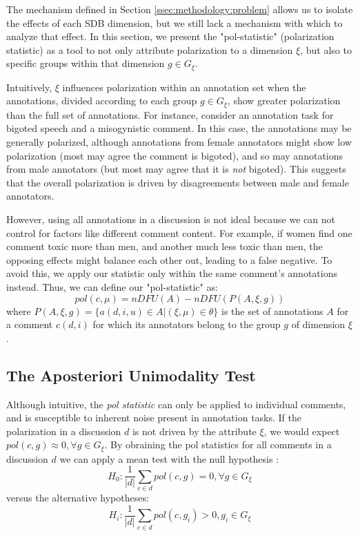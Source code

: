 \documentclass{article}
\begin{document}
The mechanism defined in Section \ref{ssec:methodology:problem} allows us to isolate the effects of each \ac{SDB} dimension, but we still lack a mechanism with which to analyze that effect. In this section, we present the "pol-statistic" (polarization statistic) as a tool to not only attribute polarization to a dimension $\xi$, but also to specific groups within that dimension $g \in G_{\xi}$.

Intuitively, $\xi$ influences polarization within an annotation set when the annotations, divided according to each group $g \in G_{\xi}$, show greater polarization than the full set of annotations. For instance, consider an annotation task for bigoted speech and a misogynistic comment. In this case, the annotations may be generally polarized, although annotations from female annotators might show low polarization (most may agree the comment is bigoted), and so may annotations from male annotators (but most may agree that it is \textit{not} bigoted). This suggests that the overall polarization is driven by disagreements between male and female annotators. %

 However, using all annotations in a discussion is not ideal because we can not control for factors like different comment content. For example, if women find one comment toxic more than men, and another much less toxic than men, the opposing effects might balance each other out, leading to a false negative. To avoid this, we apply our statistic only within the same comment’s annotations instead. Thus, we can define our "pol-statistic" as:%
\begin{equation}
	pol(c, \mu) = nDFU(A) - nDFU(P(A, \xi, g))
\end{equation}
\noindent where $P(A,\xi, g) = \{a(d, i, u) \in A | (\xi, \mu) \in \theta\}$ is the set of annotations $A$ for a comment $c(d, i)$ for which its annotators belong  to the group $g$ of dimension $\xi$.


\subsection{The Aposteriori Unimodality Test}
\label{ssec:methodology:aposteriori}

Although intuitive, the \textit{pol statistic} can only be applied to individual comments, and is susceptible to inherent noise present in annotation tasks. If the polarization in a discussion $d$ is not driven by the attribute $\xi$, we would expect $pol(c, g) \approx 0,  \forall g \in G_{\xi}$. By obraining the pol statistics for all comments in a discussion $d$ we can apply a mean test with the null hypothesis :
\begin{equation}
	H_0: \frac{1}{\lvert d \rvert} \sum\limits_{c \in d} pol(c, g) = 0, \forall g \in G_{\xi}
\end{equation}
\noindent versus the alternative hypotheses: 
\begin{equation}
	H_i:  \frac{1}{\lvert d \rvert} \sum\limits_{c \in d}  pol(c, g_i) > 0, g_i \in G_{\xi}
\end{equation}
\end{document}
